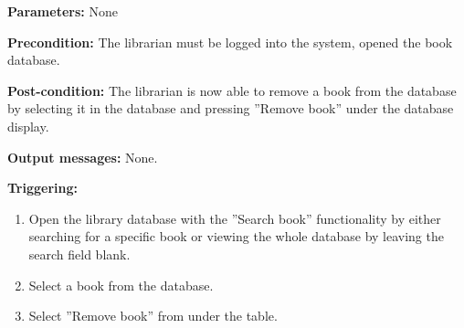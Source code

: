 \begin{description}

\item \textbf{Parameters:} None

\item \textbf{Precondition:} The librarian must be logged into the system,
opened the book database.

\item \textbf{Post-condition:} The librarian is now able to remove a book from
the database by selecting it in the database and pressing ''Remove book''
under the database display.

\item \textbf{Output messages:} None.

\item \textbf{Triggering:}
\begin{enumerate}
\item Open the library database with the ''Search book'' functionality by
either searching for a specific book or viewing the whole database by leaving
the search field blank.
\item Select a book from the database.
\item Select ''Remove book'' from under the table.
\end{enumerate}

\end{description}
